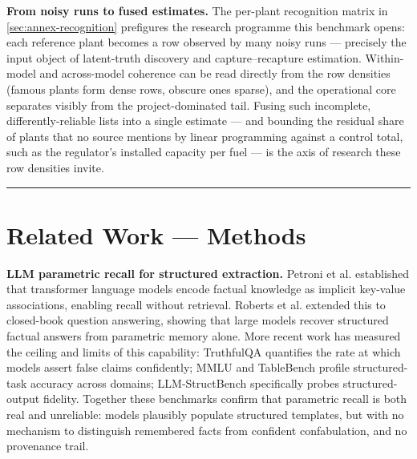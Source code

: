 \documentclass[a4paper,11pt]{article}
\begin{document}
\textbf{From noisy runs to fused estimates.} The per-plant recognition
matrix in \ref{sec:annex-recognition} prefigures the research programme
this benchmark opens: each reference plant becomes a row observed by
many noisy runs --- precisely the input object of latent-truth discovery
and capture--recapture estimation. Within-model and across-model
coherence can be read directly from the row densities (famous plants
form dense rows, obscure ones sparse), and the operational core
separates visibly from the project-dominated tail. Fusing such
incomplete, differently-reliable lists into a single estimate --- and
bounding the residual share of plants that no source mentions by linear
programming against a control total, such as the regulator's installed
capacity per fuel \citep{HaDuong2005} --- is the axis of research these
row densities invite.

\begin{center}\rule{0.5\linewidth}{0.5pt}\end{center}

\section*{Related Work --- Methods}

\textbf{LLM parametric recall for structured extraction.} Petroni et al.
\citeyearpar{Petroni-Fabio2019:lm-as-kb} established that transformer
language models encode factual knowledge as implicit key-value
associations, enabling recall without retrieval. Roberts et al.
\citeyearpar{Roberts-Adam2020:closed-book-qa} extended this to
closed-book question answering, showing that large models recover
structured factual answers from parametric memory alone. More recent
work has measured the ceiling and limits of this capability: TruthfulQA
\citep{Lin-Stephanie2022:truthfulqa} quantifies the rate at which models
assert false claims confidently; MMLU \citep{Hendrycks-Dan2021:mmlu} and
TableBench \citep{Wu-Xianjie2025:tablebench} profile structured-task
accuracy across domains; LLM-StructBench
\citep{Tenckhoff-Sonke2026:llmstructbench} specifically probes
structured-output fidelity. Together these benchmarks confirm that
parametric recall is both real and unreliable: models plausibly populate
structured templates, but with no mechanism to distinguish remembered
facts from confident confabulation, and no provenance trail.
\end{document}
